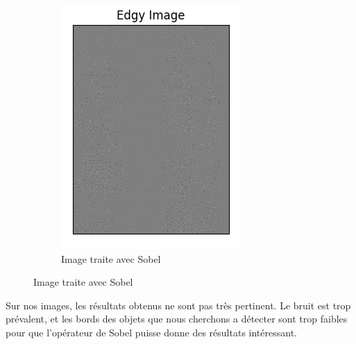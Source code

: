 \documentclass[a4paper, 12pt, titlepage, oneside, french]{article}
\begin{document}
\begin{figure}[]
\begin{subfigure}[b]{0.4\linewidth}
			\includegraphics[width=\linewidth]{Sobel1a.png}
			\caption{Image traite avec Sobel}
		\end{subfigure}
		\label{fig:OurSobel}
	\end{figure}

	Sur nos images, les résultats obtenus ne sont pas très pertinent. Le bruit est trop prévalent, et les bords des objets que nous cherchons a détecter sont trop faibles pour que l'opérateur de Sobel puisse donne des résultats intéressant.
\end{document}

